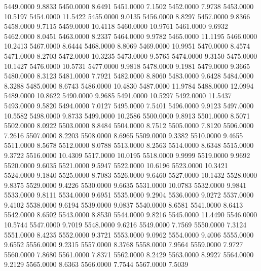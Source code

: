 5449.0000      9.8833
5450.0000      8.6491
5451.0000      7.1502
5452.0000      7.9738
5453.0000     10.5197
5454.0000     11.5422
5455.0000      9.0135
5456.0000      8.8297
5457.0000      9.8366
5458.0000      9.7115
5459.0000     10.4118
5460.0000     10.9761
5461.0000      9.6932
5462.0000      8.0451
5463.0000      8.2337
5464.0000      9.9782
5465.0000     11.1195
5466.0000     10.2413
5467.0000      8.6444
5468.0000      8.8069
5469.0000     10.9951
5470.0000      8.4574
5471.0000      8.2703
5472.0000     10.3235
5473.0000      9.5765
5474.0000      9.3150
5475.0000     10.1427
5476.0000     10.5731
5477.0000      9.9818
5478.0000      9.1981
5479.0000      9.3665
5480.0000      8.3123
5481.0000      7.7921
5482.0000      8.8060
5483.0000      9.6428
5484.0000      8.3288
5485.0000      8.6743
5486.0000     10.4830
5487.0000     11.9784
5488.0000     12.0994
5489.0000     10.8622
5490.0000      9.9685
5491.0000     10.5297
5492.0000     11.5437
5493.0000      9.5820
5494.0000      7.0127
5495.0000      7.5401
5496.0000      9.9123
5497.0000     10.5582
5498.0000      9.8733
5499.0000     10.2586
5500.0000      9.8913
5501.0000      8.5071
5502.0000      8.0922
5503.0000      8.8484
5504.0000      8.7512
5505.0000      7.8120
5506.0000      7.2616
5507.0000      8.2203
5508.0000      8.6965
5509.0000      9.3382
5510.0000      9.4655
5511.0000      8.5678
5512.0000      8.0788
5513.0000      8.2563
5514.0000      8.6348
5515.0000      9.3722
5516.0000     10.4309
5517.0000     10.0195
5518.0000      9.9999
5519.0000      9.9692
5520.0000      9.6035
5521.0000      9.5947
5522.0000     10.6196
5523.0000     10.3421
5524.0000      9.1840
5525.0000      8.7083
5526.0000      9.6460
5527.0000     10.1432
5528.0000      9.8375
5529.0000      9.4226
5530.0000      9.6635
5531.0000     10.0783
5532.0000      9.9841
5533.0000      9.8111
5534.0000      9.6951
5535.0000      9.2904
5536.0000      9.0272
5537.0000      9.4102
5538.0000      9.6194
5539.0000      9.0837
5540.0000      8.6581
5541.0000      8.6413
5542.0000      8.6502
5543.0000      8.8530
5544.0000      9.8216
5545.0000     11.4490
5546.0000     10.5744
5547.0000      9.7019
5548.0000      9.6216
5549.0000      7.7569
5550.0000      7.3124
5551.0000      8.4235
5552.0000      9.3721
5553.0000      9.0962
5554.0000      9.4006
5555.0000      9.6552
5556.0000      9.2315
5557.0000      8.3768
5558.0000      7.9564
5559.0000      7.9727
5560.0000      7.8680
5561.0000      7.8371
5562.0000      8.2429
5563.0000      8.9927
5564.0000      9.2129
5565.0000      8.6363
5566.0000      7.7544
5567.0000      7.5039
